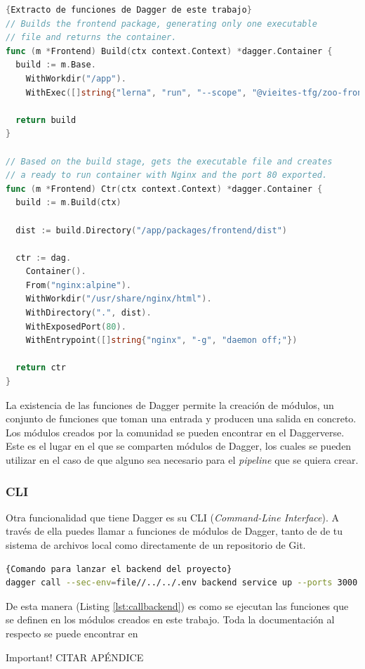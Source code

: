 \begin{lstlisting}[language=go,label=lst:daggerfunctions]{Extracto de funciones de Dagger de este trabajo}
// Builds the frontend package, generating only one executable
// file and returns the container.
func (m *Frontend) Build(ctx context.Context) *dagger.Container {
  build := m.Base.
    WithWorkdir("/app").
    WithExec([]string{"lerna", "run", "--scope", "@vieites-tfg/zoo-frontend", "build"})

  return build
}

// Based on the build stage, gets the executable file and creates
// a ready to run container with Nginx and the port 80 exported.
func (m *Frontend) Ctr(ctx context.Context) *dagger.Container {
  build := m.Build(ctx)

  dist := build.Directory("/app/packages/frontend/dist")

  ctr := dag.
    Container().
    From("nginx:alpine").
    WithWorkdir("/usr/share/nginx/html").
    WithDirectory(".", dist).
    WithExposedPort(80).
    WithEntrypoint([]string{"nginx", "-g", "daemon off;"})

  return ctr
}
\end{lstlisting}

La existencia de las funciones de Dagger permite la creación de módulos, un conjunto de funciones que toman una entrada y producen una salida en concreto. Los módulos creados por la comunidad se pueden encontrar en el Daggerverse\cite{daggerverse}. Este es el lugar en el que se comparten módulos de Dagger, los cuales se pueden utilizar en el caso de que alguno sea necesario para el \textit{pipeline} que se quiera crear.

\subsubsection*{CLI}

Otra funcionalidad que tiene Dagger es su CLI\cite{cli} (\textit{Command-Line Interface}). A través de ella puedes llamar a funciones de módulos de Dagger, tanto de de tu sistema de archivos local como directamente de un repositorio de Git.

\begin{lstlisting}[language=bash,label=lst:callbackend]{Comando para lanzar el backend del proyecto}
dagger call --sec-env=file//../../.env backend service up --ports 3000:3000
\end{lstlisting}

De esta manera (Listing \ref{lst:callbackend}) es como se ejecutan las funciones que se definen en los módulos creados en este trabajo. Toda la documentación al respecto se puede encontrar en
\begin{bclogo}[logo=\bcattention]{Important!}
  CITAR APÉNDICE
\end{bclogo}


